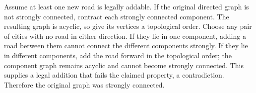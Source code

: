 Assume at least one new road is legally addable. If the original directed graph is not strongly connected, contract each strongly connected component. The resulting graph is acyclic, so give its vertices a topological order. Choose any pair of cities with no road in either direction. If they lie in one component, adding a road between them cannot connect the different components strongly. If they lie in different components, add the road forward in the topological order; the component graph remains acyclic and cannot become strongly connected. This supplies a legal addition that fails the claimed property, a contradiction. Therefore the original graph was strongly connected.
